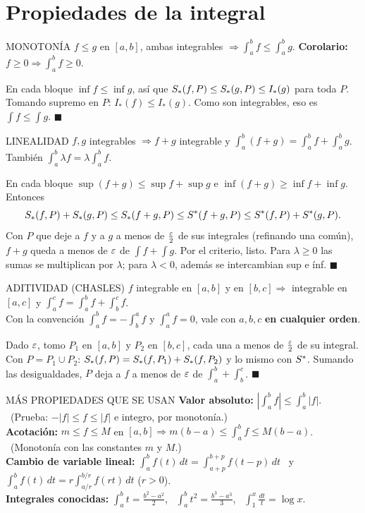 \section{Propiedades de la integral}
\apuntes
\begin{sello}{MONOTONÍA}
$f\le g$ en $[a,b]$, ambas integrables $\Rightarrow\int_a^bf\le\int_a^bg$. \quad \textbf{Corolario:} $f\ge0\Rightarrow\int_a^bf\ge0$.
\end{sello}
\begin{demo}
En cada bloque $\inf f\le\inf g$, así que $S_{*}(f,P)\le S_{*}(g,P)\le I_*(g)$ para toda $P$. Tomando supremo en $P$: $I_*(f)\le I_*(g)$. Como son integrables, eso es $\int f\le\int g$. $\blacksquare$
\end{demo}
\apuntes
\begin{sello}{LINEALIDAD}
$f,g$ integrables $\Rightarrow f+g$ integrable y $\int_a^b(f+g)=\int_a^bf+\int_a^bg$. \quad También $\int_a^b\lambda f=\lambda\int_a^bf$.
\end{sello}
\agregado
\begin{demo}
En cada bloque $\sup(f+g)\le\sup f+\sup g$ e $\inf(f+g)\ge\inf f+\inf g$. Entonces
\[S_{*}(f,P)+S_{*}(g,P)\le S_{*}(f+g,P)\le S^{*}(f+g,P)\le S^{*}(f,P)+S^{*}(g,P).\]
Con $P$ que deje a $f$ y a $g$ a menos de $\frac{\varepsilon}2$ de sus integrales (refinando una común), $f+g$ queda a menos de $\varepsilon$ de $\int f+\int g$. Por el criterio, listo. Para $\lambda\ge0$ las sumas se multiplican por $\lambda$; para $\lambda<0$, además se intercambian sup e ínf. $\blacksquare$
\end{demo}
\apuntes
\begin{sello}{ADITIVIDAD (CHASLES)}
$f$ integrable en $[a,b]$ y en $[b,c]\Rightarrow$ integrable en $[a,c]$ y $\int_a^cf=\int_a^bf+\int_b^cf$.\\[3pt]
Con la convención $\int_a^bf=-\int_b^af$ y $\int_a^af=0$, vale con $a,b,c$ \textbf{en cualquier orden}.
\end{sello}
\begin{demo}
Dado $\varepsilon$, tomo $P_1$ en $[a,b]$ y $P_2$ en $[b,c]$, cada una a menos de $\frac{\varepsilon}2$ de su integral. Con $P=P_1\cup P_2$: $S_{*}(f,P)=S_{*}(f,P_1)+S_{*}(f,P_2)$ y lo mismo con $S^{*}$. Sumando las desigualdades, $P$ deja a $f$ a menos de $\varepsilon$ de $\int_a^b+\int_b^c$. $\blacksquare$
\end{demo}
\agregado
\begin{sello}{MÁS PROPIEDADES QUE SE USAN}
\textbf{Valor absoluto:} $\left|\int_a^bf\right|\le\int_a^b|f|$. \ (Prueba: $-|f|\le f\le|f|$ e integro, por monotonía.)\\[2pt]
\textbf{Acotación:} $m\le f\le M$ en $[a,b]\Rightarrow m(b-a)\le\int_a^bf\le M(b-a)$. \ (Monotonía con las constantes $m$ y $M$.)\\[2pt]
\textbf{Cambio de variable lineal:} $\int_a^bf(t)\,dt=\int_{a+p}^{b+p}f(t-p)\,dt$ \ y \ $\int_a^bf(t)\,dt=r\int_{a/r}^{b/r}f(rt)\,dt$ ($r>0$).\\[2pt]
\textbf{Integrales conocidas:} $\int_a^bt=\frac{b^2-a^2}2$, \ $\int_a^bt^2=\frac{b^3-a^3}3$, \ $\int_1^x\frac{dt}t=\log x$.
\end{sello}

